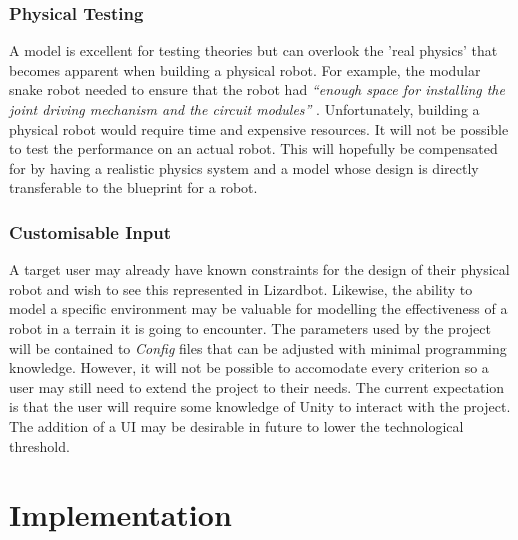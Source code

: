 \documentclass{article}
\begin{document}
\subsubsection{Physical Testing}
\label{sec:Physical Testing}
A model is excellent for testing theories but can overlook the 'real physics' that becomes apparent when building a physical robot. For example, the modular snake robot needed to ensure that the robot had \textit{“enough space for installing the joint driving mechanism and the circuit modules”} .
Unfortunately, building a physical robot would require time and expensive resources. It will not be possible to test the performance  on an actual robot. This will hopefully be compensated for by having a realistic physics system and a model whose design is directly transferable to the blueprint for a robot.

\subsubsection{Customisable Input}
\label{sec:Customisable Input}
A target user may already have known constraints for the design of their physical robot and wish to see this represented in Lizardbot. Likewise, the ability to model a specific environment may be valuable for modelling the effectiveness of a robot in a terrain it is going to encounter.
The parameters used by the project will be contained to \textit{Config} files that can be adjusted with minimal programming knowledge. However, it will not be possible to accomodate every criterion so a user may still need to extend the project to their needs. 
The current expectation is that the user will require some knowledge of Unity to interact with the project. The addition of a UI may be desirable in future to lower the technological threshold. 



\newpage
\section{Implementation}
\label{sec:Implementation}
\end{document}
